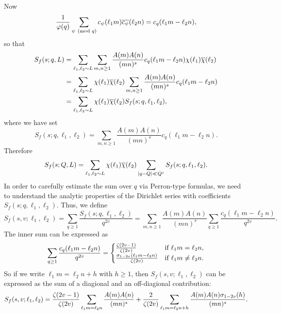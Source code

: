 \documentclass[12pt,reqno,oneside]{amsart}
\begin{document}
  Now
  \[
    \frac{1}{\varphi(q)}\sum_{\psi \ \left(\text{mod }q\right)}c_{\psi}(\ell_{1}m)\overline{c_{\psi}}(\ell_{2}n) = c_{q}(\ell_{1}m-\ell_{2}n),
  \]
  so that
  \begin{align*}
    S_{f}(s;q,L) &= \sum_{\ell_{1},\ell_{2} \sim L}\sum_{m,n \ge 1}\frac{A(m)A(n)}{(mn)^{s}}c_{q}(\ell_{1}m-\ell_{2}n)\chi(\ell_{1})\overline{\chi}(\ell_{2}) \\
    &= \sum_{\ell_{1},\ell_{2} \sim L}\chi(\ell_{1})\overline{\chi}(\ell_{2})\sum_{m,n \ge 1}\frac{A(m)A(n)}{(mn)^{s}}c_{q}(\ell_{1}m-\ell_{2}n) \\
    &= \sum_{\ell_{1},\ell_{2} \sim L}\chi(\ell_{1})\overline{\chi}(\ell_{2})S_{f}(s;q,\ell_{1},\ell_{2}),
  \end{align*}
  where we have set
  \[
    S_{f}(s;q,\ell_{1},\ell_{2}) = \sum_{m,n \ge 1}\frac{A(m)A(n)}{(mn)^{s}}c_{q}(\ell_{1}m-\ell_{2}n).
  \]
  Therefore
  \[
      S_{f}(s;Q,L) = \sum_{\ell_{1},\ell_{2} \sim L}\chi(\ell_{1})\overline{\chi}(\ell_{2})\sum_{|q-Q| \ll Q^{\varepsilon}}S_{f}(s;q,\ell_{1},\ell_{2}).
  \]
  In order to carefully estimate the sum over $q$ via Perron-type formulas, we need to understand the analytic properties of the Dirichlet series with coefficients $S_{f}(s;q,\ell_{1},\ell_{2})$. Thus, we define
  \[
    S_{f}(s,v;\ell_{1},\ell_{2}) = \sum_{q \ge 1}\frac{S_{f}(s;q,\ell_{1},\ell_{2})}{q^{2v}} = \sum_{m,n \ge 1}\frac{A(m)A(n)}{(mn)^{s}}\sum_{q \ge 1}\frac{c_{q}(\ell_{1}m-\ell_{2}n)}{q^{2v}}.
  \]
  The inner sum can be expressed as
  \[
    \sum_{q \ge 1}\frac{c_{q}(\ell_{1}m-\ell_{2}n)}{q^{2v}} = \begin{cases} \frac{\zeta(2v-1)}{\zeta(2v)} & \text{if $\ell_{1}m = \ell_{2}n$}, \\ \frac{\sigma_{1-2v}(\ell_{1}m-\ell_{2}n)}{\zeta(2v)} & \text{if $\ell_{1}m \neq \ell_{2}n$}. \end{cases}
  \]
  So if we write $\ell_{1}m = \ell_{2}n+h$ with $h \ge 1$, then $S_{f}(s,v;\ell_{1},\ell_{2})$ can be expressed as the sum of a diagional and an off-diagional contribution:
  \[
    S_{f}(s,v;\ell_{1},\ell_{2}) = \frac{\zeta(2v-1)}{\zeta(2v)}\sum_{\ell_{1}m = \ell_{2}n}\frac{A(m)A(n)}{(mn)^{s}}+\frac{2}{\zeta(2v)}\sum_{\ell_{1}m = \ell_{2}n+h}\frac{A(m)A(n)\sigma_{1-2v}(h)}{(mn)^{s}}.
  \]
\end{document}

